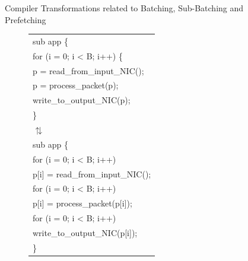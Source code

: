 \documentclass[final]{beamer}
\newlength{\sepwid}
\newlength{\onecolwid}
\newlength{\twocolwid}
\begin{document}
\begin{frame}
\begin{columns}[t]
\begin{column}{\onecolwid}
\end{column} %
\begin{column}{\sepwid}\end{column} %
\begin{column}{\twocolwid} %
\begin{exampleblock}{Compiler Transformations related to Batching, Sub-Batching and Prefetching}
\begin{multicols}{3}
\begin{figure}[ht]
\begin{tiny}
\begin{tabular}[b]{p{\onecolwid}}
sub app \{ \\
\hspace{0.2\sepwid}for (i = 0; i < B; i++) \{ \\
\hspace{0.4\sepwid}p = read\_from\_input\_NIC(); \\
\hspace{0.4\sepwid}p = process\_packet(p); \\
\hspace{0.4\sepwid}write\_to\_output\_NIC(p); \\
\hspace{0.2\sepwid}\}\\
\vspace{1cm}
\hspace{1\sepwid}$\updownarrows$\\
\vspace{1cm}
sub app \{\\
\hspace{0.2\sepwid}for (i = 0; i < B; i++)\\
\hspace{0.4\sepwid}p[i] = read\_from\_input\_NIC();\\
\hspace{0.2\sepwid}for (i = 0; i < B; i++)\\
\hspace{0.4\sepwid}p[i] = process\_packet(p[i]);\\
\hspace{0.2\sepwid}for (i = 0; i < B; i++)\\
\hspace{0.4\sepwid}write\_to\_output\_NIC(p[i]);\\
\}
\end{tabular}

\end{tiny}
\end{figure}
\end{multicols}
\end{exampleblock}
\end{column}
\end{columns}
\end{frame}
\end{document}
